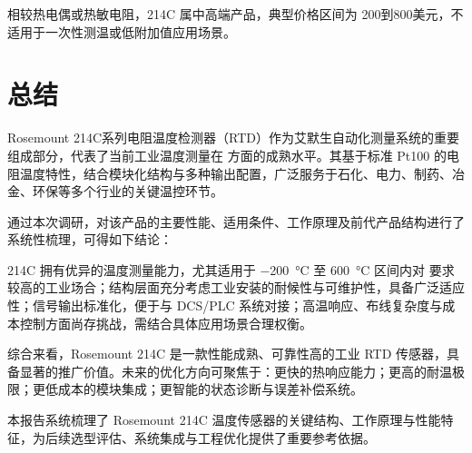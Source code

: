 相较热电偶或热敏电阻，214C 属中高端产品，典型价格区间为 200到800美元，不适用于一次性测温或低附加值应用场景。

\section{总结}

Rosemount 214C系列电阻温度检测器（RTD）作为艾默生自动化测量系统的重要组成部分，代表了当前工业温度测量在  方面的成熟水平。其基于标准 Pt100 的电阻温度特性，结合模块化结构与多种输出配置，广泛服务于石化、电力、制药、冶金、环保等多个行业的关键温控环节。

通过本次调研，对该产品的主要性能、适用条件、工作原理及前代产品结构进行了系统性梳理，可得如下结论：

214C 拥有优异的温度测量能力，尤其适用于 \SI{-200}{\degreeCelsius} 至 \SI{+600}{\degreeCelsius} 区间内对  要求较高的工业场合；结构层面充分考虑工业安装的耐候性与可维护性，具备广泛适应性；信号输出标准化，便于与 DCS/PLC 系统对接；高温响应、布线复杂度与成本控制方面尚存挑战，需结合具体应用场景合理权衡。

综合来看，Rosemount 214C 是一款性能成熟、可靠性高的工业 RTD 传感器，具备显著的推广价值。未来的优化方向可聚焦于：更快的热响应能力；更高的耐温极限；更低成本的模块集成；更智能的状态诊断与误差补偿系统。

本报告系统梳理了 Rosemount 214C 温度传感器的关键结构、工作原理与性能特征，为后续选型评估、系统集成与工程优化提供了重要参考依据。
